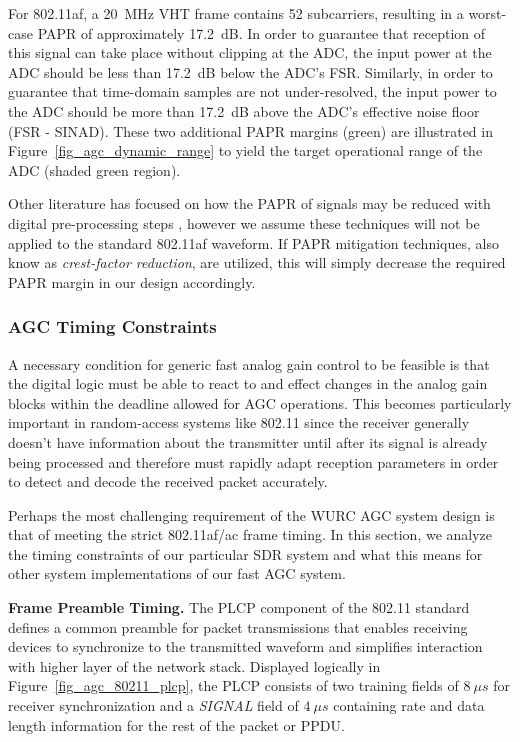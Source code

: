 For 802.11af, a 20~MHz VHT frame contains 52 subcarriers, resulting in a worst-case \ac{PAPR} of approximately 17.2~dB.
In order to guarantee that reception of this signal can take place without clipping at the ADC, the input power at the ADC should be less than 17.2~dB below the ADC's \ac{FSR}.
Similarly, in order to guarantee that time-domain samples are not under-resolved, the input power to the ADC should be more than 17.2~dB above the ADC's effective noise floor (FSR - SINAD).
These two additional \ac{PAPR} margins (green) are illustrated in Figure~\ref{fig_agc_dynamic_range} to yield the target operational range of the ADC (shaded green region).

Other literature has focused on how the \ac{PAPR} of signals may be reduced with digital pre-processing steps \cite{bauml1996reducing}, however we assume these techniques will not be applied to the standard 802.11af waveform.
If \ac{PAPR} mitigation techniques, also know as \emph{crest-factor reduction}, are utilized, this will simply decrease the required \ac{PAPR} margin in our design accordingly.


\subsubsection{AGC Timing Constraints}
\label{sec_agc_timing}

	A necessary condition for generic fast analog gain control to be feasible is that the digital logic must be able to react to and effect changes in the analog gain blocks within the deadline allowed for \ac{AGC} operations.
	This becomes particularly important in random-access systems like 802.11 since the receiver generally doesn't have information about the transmitter until after its signal is already being processed and therefore must rapidly adapt reception parameters in order to detect and decode the received packet accurately.

	Perhaps the most challenging requirement of the \ac{WURC} AGC system design is that of meeting the strict 802.11af/ac frame timing.
	In this section, we analyze the timing constraints of our particular \ac{SDR} system and what this means for other system implementations of our fast \ac{AGC} system.

\textbf{Frame Preamble Timing.} The \ac{PLCP} component of the 802.11 standard defines a common preamble for packet transmissions that enables receiving devices to synchronize to the transmitted waveform \cite{perahia2013next, 80211ac} and simplifies interaction with higher layer of the network stack.
	Displayed logically in Figure~\ref{fig_agc_80211_plcp}, the \ac{PLCP} consists of two training fields of $8~\mu s$ for receiver synchronization and a \emph{SIGNAL} field of $4~\mu s$ containing rate and data length information for the rest of the packet or \ac{PPDU}.

